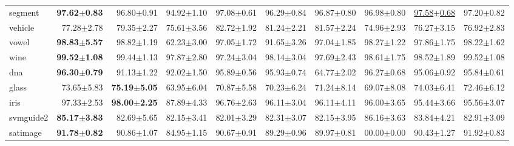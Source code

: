 \documentclass{article}
\begin{document}
\begin{table*}[t]
\begin{tabular*}{\linewidth}{@{\extracolsep{\fill}}lrrrrrrrrr}
segment            & \textbf{97.62$\pm$0.83}   &96.80$\pm$0.91            &94.92$\pm$1.10      &97.08$\pm$0.61            &96.29$\pm$0.84       &96.87$\pm$0.80    &96.98$\pm$0.80             &\underline{97.58$\pm$0.68}&97.20$\pm$0.82\\
vehicle            & 77.28$\pm$2.78            &79.35$\pm$2.27            &75.61$\pm$3.56      &82.72$\pm$1.92            &81.24$\pm$2.21       &81.57$\pm$2.24    &74.96$\pm$2.93             &76.27$\pm$3.15            &76.92$\pm$2.83\\
vowel              &\textbf{98.83$\pm$5.57}    &98.82$\pm$1.19            &62.23$\pm$3.00      &97.05$\pm$1.72            &91.65$\pm$3.26       &97.04$\pm$1.85    &98.27$\pm$1.22             &97.86$\pm$1.75            &98.22$\pm$1.62\\
wine               &\textbf{99.52$\pm$1.08}    &99.44$\pm$1.13            &97.87$\pm$2.80      &97.24$\pm$3.04            &98.14$\pm$3.04       &97.69$\pm$2.43    &98.61$\pm$1.75             &98.52$\pm$1.89            &99.52$\pm$1.08            \\
dna                &\textbf{96.30$\pm$0.79}    &91.13$\pm$1.22            &92.02$\pm$1.50      &95.89$\pm$0.56            &95.93$\pm$0.74       &64.77$\pm$2.02    &96.27$\pm$0.68             &95.06$\pm$0.92            &95.84$\pm$0.61\\
glass              & 73.65$\pm$5.83            &\textbf{75.19$\pm$5.05}   &63.95$\pm$6.04      &70.87$\pm$5.58            &70.23$\pm$6.24       &71.24$\pm$8.14    &69.07$\pm$8.08             &74.03$\pm$6.41            &72.46$\pm$6.12\\
iris               &97.33$\pm$2.53             &\textbf{98.00$\pm$2.25}            &87.89$\pm$4.33      &96.76$\pm$2.63            &96.11$\pm$3.04    &96.11$\pm$4.11    &96.00$\pm$3.65             &95.44$\pm$3.66            &95.56$\pm$3.07\\
svmguide2          &\textbf{85.17$\pm$3.83}    &82.69$\pm$5.65            &82.15$\pm$3.41      &82.01$\pm$3.29            &82.31$\pm$3.07       &82.15$\pm$3.95    &86.16$\pm$3.63             &83.84$\pm$4.21            &82.91$\pm$3.09\\
satimage           &\textbf{91.78$\pm$0.82}    &90.86$\pm$1.07            &84.95$\pm$1.15      &90.67$\pm$0.91            &89.29$\pm$0.96       &89.97$\pm$0.81    &00.00$\pm$0.00            &90.43$\pm$1.27            &91.92$\pm$0.83\\
\bottomrule
\end{tabular*}
\vspace{-0.3cm}
\end{table*}
\end{document}
